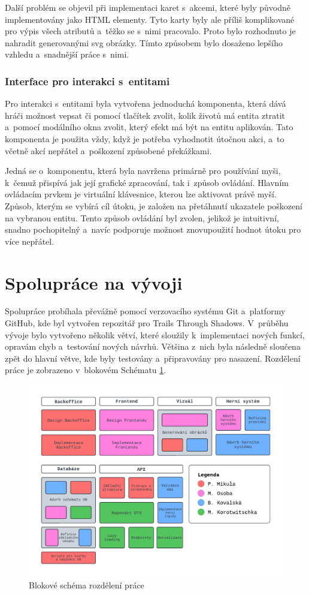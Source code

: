Další problém se objevil při implementaci karet s~akcemi, které byly původně implementovány jako HTML elementy. Tyto karty byly ale příliš komplikované pro výpis všech atributů a~těžko se s~nimi pracovalo. Proto bylo rozhodnuto je nahradit generovanými svg obrázky. Tímto způsobem bylo dosaženo lepšího vzhledu a~snadnější práce s~nimi.

\subsubsection*{Interface pro interakci s~entitami}
Pro interakci s~entitami byla vytvořena jednoduchá komponenta, která dává hráči možnost vepsat či pomocí tlačítek zvolit, kolik životů má entita ztratit a~pomocí modálního okna zvolit, který efekt má být na entitu aplikován. Tato komponenta je použita vždy, když je potřeba vyhodnotit útočnou akci, a~to včetně akcí nepřátel a~poškození způsobené překážkami.

Jedná se o~komponentu, která byla navržena primárně pro používání myši, k~čemuž přispívá jak její grafické zpracování, tak i~způsob ovládání. Hlavním ovládacím prvkem je virtuální klávesnice, kterou lze aktivovat právě myší. Způsob, kterým se vybírá cíl útoku, je založen na přetáhnutí ukazatele poškození na vybranou entitu. Tento způsob ovládání byl zvolen, jelikož je intuitivní, snadno pochopitelný a~navíc podporuje možnost znovupoužití hodnot útoku pro více nepřátel.

\section{Spolupráce na vývoji}
Spolupráce probíhala převážně pomocí verzovacího systému Git a~platformy GitHub, kde byl vytvořen repozitář pro Trails Through Shadows. V~průběhu vývoje bylo vytvořeno několik větví, které sloužily k~implementaci nových funkcí, opravám chyb a~testování nových návrhů. Většina z~nich byla následně sloučena zpět do hlavní větve, kde byly testovány a~připravovány pro nasazení. Rozdělení práce je zobrazeno v~blokovém Schématu \ref{fig:workflow}.

\begin{figure}[H]
  \centering
  \includegraphics[width=.95\textwidth]{../../shared/diagrams/blocks.pdf}
  \caption{Blokové schéma rozdělení práce}
  \label{fig:workflow}
\end{figure}

